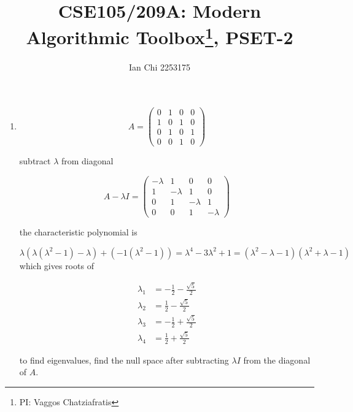 \documentclass{article}
\title{CSE105/209A: Modern Algorithmic Toolbox\footnote{PI: Vaggos Chatziafratis}, PSET-2\\ }
\author{Ian Chi 2253175}
\date{}
\begin{document}
\maketitle

\section{}
\begin{enumerate}
  \item 
  \begin{equation}
    A = \begin{pmatrix}
    0 & 1 & 0 & 0 \\
    1 & 0 & 1 & 0 \\
    0 & 1 & 0 & 1 \\
    0 & 0 & 1 & 0
    \end{pmatrix}
  \end{equation}
  
  subtract \(\lambda\) from diagonal
  
  \begin{equation}
    A-\lambda I = \begin{pmatrix}
    -\lambda & 1 & 0 & 0 \\
    1 & -\lambda & 1 & 0 \\
    0 & 1 & -\lambda & 1 \\
    0 & 0 & 1 & -\lambda
    \end{pmatrix}
  \end{equation}
  
  the characteristic polynomial is 
  
  \begin{equation}
    \lambda(\lambda(\lambda^2-1)-\lambda) + (-1(\lambda^2-1)) = \lambda^4-3\lambda^2+1 = (\lambda^2 - \lambda - 1)(\lambda^2 + \lambda-1)
  \end{equation}
  which gives roots of 
  
  \begin{equation}
    \begin{split}
      \lambda_1 &= -\frac{1}{2}-\frac{\sqrt{5}}{2}\\
      \lambda_2 &= \frac{1}{2}-\frac{\sqrt{5}}{2}\\
      \lambda_3 &= -\frac{1}{2}+\frac{\sqrt{5}}{2}\\
      \lambda_4 &= \frac{1}{2}+\frac{\sqrt{5}}{2}
    \end{split}
  \end{equation}

  to find eigenvalues, find the null space after subtracting \(\lambda I\) from the diagonal of \(A\). 



\end{enumerate}
\end{document}
